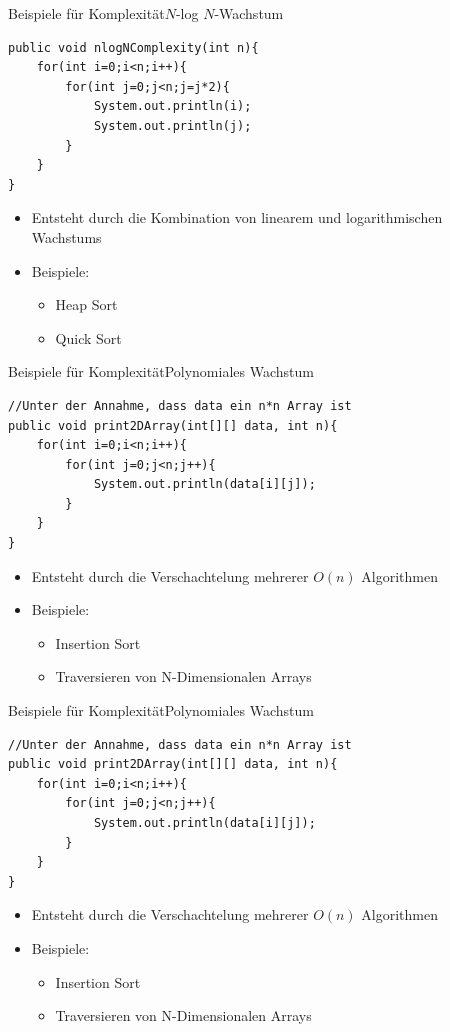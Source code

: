 \begin{frame}[fragile]{Beispiele für Komplexität}{$N$-log $N$-Wachstum}
\lstset{style=java}
\begin{lstlisting}
public void nlogNComplexity(int n){
    for(int i=0;i<n;i++){
        for(int j=0;j<n;j=j*2){
            System.out.println(i);
            System.out.println(j);
        }
    }
}
\end{lstlisting}
\begin{itemize}
    \item Entsteht durch die Kombination von linearem und logarithmischen Wachstums
    \item Beispiele:
    \begin{itemize}
        \item Heap Sort
        \item Quick Sort
    \end{itemize}
\end{itemize}
\end{frame}

\begin{frame}[fragile]{Beispiele für Komplexität}{Polynomiales Wachstum}
\lstset{style=java}
\begin{lstlisting}
//Unter der Annahme, dass data ein n*n Array ist
public void print2DArray(int[][] data, int n){
    for(int i=0;i<n;i++){
        for(int j=0;j<n;j++){
            System.out.println(data[i][j]);
        }
    }
}
\end{lstlisting}
\begin{itemize}
    \item Entsteht durch die Verschachtelung mehrerer $O(n)$ Algorithmen
    \item Beispiele:
    \begin{itemize}
        \item Insertion Sort
        \item Traversieren von N-Dimensionalen Arrays
    \end{itemize}
\end{itemize}
\end{frame}

\begin{frame}[fragile]{Beispiele für Komplexität}{Polynomiales Wachstum}
\lstset{style=java}
\begin{lstlisting}
//Unter der Annahme, dass data ein n*n Array ist
public void print2DArray(int[][] data, int n){
    for(int i=0;i<n;i++){
        for(int j=0;j<n;j++){
            System.out.println(data[i][j]);
        }
    }
}
\end{lstlisting}
\begin{itemize}
    \item Entsteht durch die Verschachtelung mehrerer $O(n)$ Algorithmen
    \item Beispiele:
    \begin{itemize}
        \item Insertion Sort
        \item Traversieren von N-Dimensionalen Arrays
    \end{itemize}
\end{itemize}
\end{frame}

